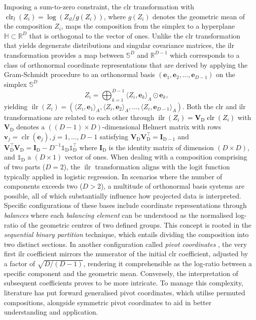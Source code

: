 \documentclass[12pt]{article}
\theoremstyle{plain}
\theoremstyle{definition}
\DeclareMathOperator{\clr}{clr}
\DeclareMathOperator{\ilr}{ilr}
\begin{document}
Imposing a sum-to-zero constraint, the clr transformation with \textcolor{black}{$\clr_l(Z_i)=\log(Z_{il}/g(Z_i))$}, where $g(Z_i)$ denotes the geometric mean of the composition $Z_i$, maps the composition from the simplex to a hyperplane $\mathds{H}\subset\mathds{R}^{D}$ that is orthogonal to the vector of ones. Unlike the clr transformation that yields degenerate distributions and singular covariance matrices, the ilr transformation provides a map between $\mathds{S}^D$ and $\mathds{R}^{D-1}$ which corresponds to a class of orthonormal coordinate representations that are derived by applying the Gram-Schmidt procedure to an orthonormal basis $(\mathbf{e}_1, \mathbf{e}_2,\ldots,\mathbf{e}_{D-1})$ on the simplex $\mathds{S}^D$ 
\[
Z_i=\bigoplus_{k=1}^{D-1}\langle Z_i,\mathbf{e}_k\rangle_A\odot\mathbf{e}_k, \ \ %
\]
yielding $\ilr(Z_i) = \left(\langle Z_i,\mathbf{e}_1\rangle_A,\langle Z_i,\mathbf{e}_2\rangle_A,\ldots,\langle Z_i,\mathbf{e}_{D-1}\rangle_A\right)$.
Both the clr and ilr transformations are related to each other through \textcolor{black}{$\ilr(Z_i)=\mathbf{V}_\mathrm{D}\clr(Z_i)$} with $\mathbf{V}_\mathrm{D}$ denotes a $((D-1)\times D)$-dimensional Helmert matrix with rows $\mathbf{v}_j=\clr(\mathbf{e}_j), j=1,\ldots,D-1$  satisfying $\mathbf{V}_\mathrm{D}\mathbf{V}_\mathrm{D}^{\top}=\mathbf{I}_{\mathrm{D}-1}$ and $\mathbf{V}_\mathrm{D}^{\top}\mathbf{V}_\mathrm{D}=\mathbf{I}_{\mathrm{D}}-D^{-1}\mathds{1}_\mathrm{D}\mathds{1}^{\top}_\mathrm{D}$ where $\mathbf{I}_{\mathrm{D}}$ is the identity matrix of dimension $(D\times D)$, and $\mathds{1}_\mathrm{D}$ a $(D\times 1)$ vector of ones. When dealing with a composition comprising of two parts ($D=2$), the $\ilr$ transformation aligns with the logit function typically applied in logistic regression. In scenarios where the number of components exceeds two ($D>2$), a multitude of orthonormal basis systems are possible, all of which substantially influence how projected data is interpreted. Specific configurations of these bases include coordinate representations through \textit{balances} \citep{Egozcue2005:Balances} where each \textit{balancing element} can be understood as the normalised log-ratio of the geometric centres of two defined groups. This concept is rooted in the \textit{sequential binary partition} technique, which entails dividing the composition into two distinct sections. In another configuration called \textit{pivot coordinates} \citep{Fiserova2011, Hron2017}, the very first ilr coefficient mirrors the numerator of the initial clr coefficient, adjusted by a factor of $\sqrt{D/(D-1)}$, rendering it comprehensible as the log-ratio between a specific component and the geometric mean. Conversely, the interpretation of subsequent coefficients proves to be more intricate. To manage this complexity, literature has put forward generalised pivot coordinates, which utilise permuted compositions, alongside symmetric pivot coordinates \citep[see][for further details]{sym:pivot, Hron2021} to aid in better understanding and application.
\end{document}

